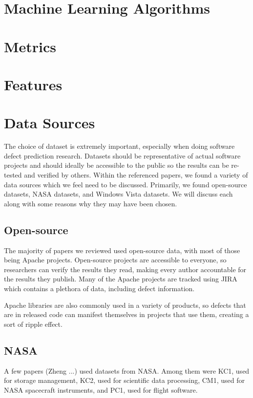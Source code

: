 \documentclass{sig-alternate-05-2015}
\begin{document}
\section{Machine Learning Algorithms}

\section{Metrics}

\section{Features}

\section{Data Sources}
The choice of dataset is extremely important, especially when doing software defect prediction research. Datasets should be representative of actual software projects and should ideally be accessible to the public so the results can be re-tested and verified by others. Within the referenced papers, we found a variety of data sources which we feel need to be discussed. Primarily, we found open-source datasets, NASA datasets, and Windows Vista datasets. We will discuss each along with some reasons why they may have been chosen.
\subsection{Open-source}
The majority of papers we reviewed used open-source data, with most of those being Apache projects. Open-source projects are accessible to everyone, so researchers can verify the results they read, making every author accountable for the results they publish. Many of the Apache projects are tracked using JIRA which contains a plethora of data, including defect information.

Apache libraries are also commonly used in a variety of products, so defects that are in released code can manifest themselves in projects that use them, creating a sort of ripple effect.

\subsection{NASA}
A few papers (Zheng \cite{zheng2010}...) used datasets from NASA. Among them were KC1, used for storage management, KC2, used for scientific data processing, CM1, used for NASA spacecraft instruments, and PC1, used for flight software.
\end{document}
